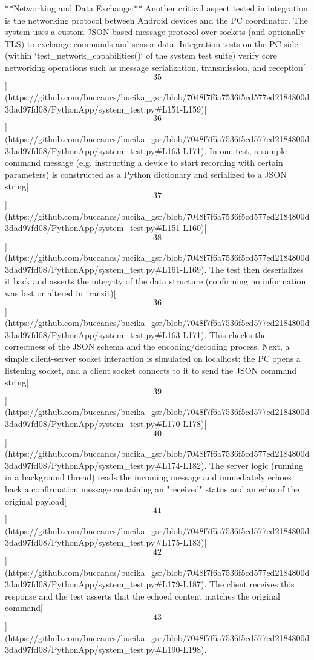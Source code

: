 \documentclass[12pt,a4paper]{article}
\begin{document}
{**Networking and Data Exchange:** Another critical aspect tested in
integration is the networking protocol between Android devices and the
PC coordinator. The system uses a custom JSON-based message protocol
over sockets (and optionally TLS) to exchange commands and sensor data.
Integration tests on the PC side (within `test_network_capabilities()`
of the system test suite) verify core networking operations such as
message serialization, transmission, and
reception[\[35\]](https://github.com/buccancs/bucika_gsr/blob/7048f7f6a7536f5cd577ed2184800d3dad97fd08/PythonApp/system_test.py#L151-L159)[\[36\]](https://github.com/buccancs/bucika_gsr/blob/7048f7f6a7536f5cd577ed2184800d3dad97fd08/PythonApp/system_test.py#L163-L171).
In one test, a sample command message (e.g. instructing a device to
start recording with certain parameters) is constructed as a Python
dictionary and serialized to a JSON
string[\[37\]](https://github.com/buccancs/bucika_gsr/blob/7048f7f6a7536f5cd577ed2184800d3dad97fd08/PythonApp/system_test.py#L151-L160)[\[38\]](https://github.com/buccancs/bucika_gsr/blob/7048f7f6a7536f5cd577ed2184800d3dad97fd08/PythonApp/system_test.py#L161-L169).
The test then deserializes it back and asserts the integrity of the data
structure (confirming no information was lost or altered in
transit)[\[36\]](https://github.com/buccancs/bucika_gsr/blob/7048f7f6a7536f5cd577ed2184800d3dad97fd08/PythonApp/system_test.py#L163-L171).
This checks the correctness of the JSON schema and the encoding/decoding
process. Next, a simple client-server socket interaction is simulated on
localhost: the PC opens a listening socket, and a client socket connects
to it to send the JSON command
string[\[39\]](https://github.com/buccancs/bucika_gsr/blob/7048f7f6a7536f5cd577ed2184800d3dad97fd08/PythonApp/system_test.py#L170-L178)[\[40\]](https://github.com/buccancs/bucika_gsr/blob/7048f7f6a7536f5cd577ed2184800d3dad97fd08/PythonApp/system_test.py#L174-L182).
The server logic (running in a background thread) reads the incoming
message and immediately echoes back a confirmation message containing an
"received" status and an echo of the original
payload[\[41\]](https://github.com/buccancs/bucika_gsr/blob/7048f7f6a7536f5cd577ed2184800d3dad97fd08/PythonApp/system_test.py#L175-L183)[\[42\]](https://github.com/buccancs/bucika_gsr/blob/7048f7f6a7536f5cd577ed2184800d3dad97fd08/PythonApp/system_test.py#L179-L187).
The client receives this response and the test asserts that the echoed
content matches the original
command[\[43\]](https://github.com/buccancs/bucika_gsr/blob/7048f7f6a7536f5cd577ed2184800d3dad97fd08/PythonApp/system_test.py#L190-L198).
}
\end{document}

